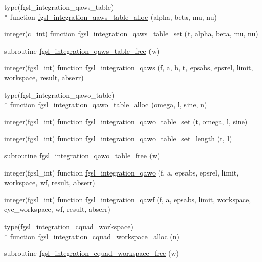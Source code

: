 \begin{DoxyCompactItemize}
type(fgsl\-\_\-integration\-\_\-qaws\-\_\-table) \\*
function \hyperlink{integration_8finc_a1b6e906b66759c0fdf4ff29cce1b3d7d}{fgsl\-\_\-integration\-\_\-qaws\-\_\-table\-\_\-alloc} (alpha, beta, mu, nu)
\item 
integer(c\-\_\-int) function \hyperlink{integration_8finc_a3ebff9b31d58dc16c86dcbb4e78ca147}{fgsl\-\_\-integration\-\_\-qaws\-\_\-table\-\_\-set} (t, alpha, beta, mu, nu)
\item 
subroutine \hyperlink{integration_8finc_afbdbd695fee99b46d0c7eecfd8d47090}{fgsl\-\_\-integration\-\_\-qaws\-\_\-table\-\_\-free} (w)
\item 
integer(fgsl\-\_\-int) function \hyperlink{integration_8finc_acfd1871c7ba87e757856816892c109d6}{fgsl\-\_\-integration\-\_\-qaws} (f, a, b, t, epsabs, epsrel, limit, workspace, result, abserr)
\item 
type(fgsl\-\_\-integration\-\_\-qawo\-\_\-table) \\*
function \hyperlink{integration_8finc_ae0570ee20a37dcf429578cdaf6ee23f9}{fgsl\-\_\-integration\-\_\-qawo\-\_\-table\-\_\-alloc} (omega, l, sine, n)
\item 
integer(fgsl\-\_\-int) function \hyperlink{integration_8finc_af7958cb95b86e6240d437d1f95d39bf1}{fgsl\-\_\-integration\-\_\-qawo\-\_\-table\-\_\-set} (t, omega, l, sine)
\item 
integer(fgsl\-\_\-int) function \hyperlink{integration_8finc_ae1ff71ea188bac440272f58cf122ede8}{fgsl\-\_\-integration\-\_\-qawo\-\_\-table\-\_\-set\-\_\-length} (t, l)
\item 
subroutine \hyperlink{integration_8finc_a6ab4eb9bc12269b4318fbf1f51310816}{fgsl\-\_\-integration\-\_\-qawo\-\_\-table\-\_\-free} (w)
\item 
integer(fgsl\-\_\-int) function \hyperlink{integration_8finc_a63f7e2b34135b050947ffdb90bdfd0d0}{fgsl\-\_\-integration\-\_\-qawo} (f, a, epsabs, epsrel, limit, workspace, wf, result, abserr)
\item 
integer(fgsl\-\_\-int) function \hyperlink{integration_8finc_a168d9d1ad61f4965849dee091ec0e105}{fgsl\-\_\-integration\-\_\-qawf} (f, a, epsabs, limit, workspace, cyc\-\_\-workspace, wf, result, abserr)
\item 
type(fgsl\-\_\-integration\-\_\-cquad\-\_\-workspace) \\*
function \hyperlink{integration_8finc_ab01960acc26965be1f87862eaa41e200}{fgsl\-\_\-integration\-\_\-cquad\-\_\-workspace\-\_\-alloc} (n)
\item 
subroutine \hyperlink{integration_8finc_a96d0eb5c74542389355dd8c1fe35d5bd}{fgsl\-\_\-integration\-\_\-cquad\-\_\-workspace\-\_\-free} (w)

\end{DoxyCompactItemize}
